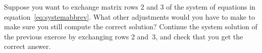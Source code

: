   Suppose you want to exchange matrix rows 2 and 3 of the system of
  equations in equation~\eqref{eq:systemabbrev}. What other
  adjustments would you have to make to make sure you still compute the
  correct solution?
  Continue the system solution of the previous exercse
  by exchanging rows 2 and~3, and check that you get the correct answer.
